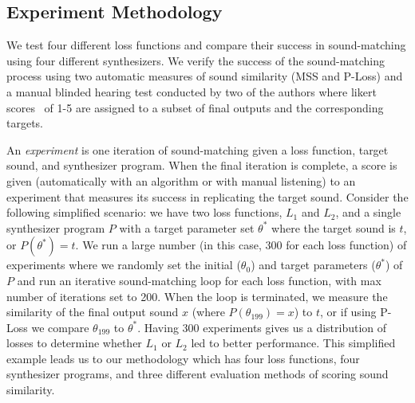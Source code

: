 \documentclass[lettersize,journal]{IEEEtran}
\newcommand{\LossSelect}{\textbf{Loss Selection}}
\newcommand{\SynthSelect}{\textbf{Synthesis Selection}}
\begin{document}

\subsection{Experiment Methodology}
\label{sec:methodology}

We test four different loss functions and compare their success in sound-matching using four different synthesizers. We verify the success of the sound-matching process using two automatic measures of sound similarity (MSS and P-Loss) and a manual blinded hearing test conducted by two of the authors where likert scores~\cite{jebb2021review} of 1-5 are assigned to a subset of final outputs and the corresponding targets.

An \textit{experiment} is one iteration of sound-matching given a loss function, target sound,
and synthesizer program. When the final iteration is complete, a score is given (automatically with an algorithm or with manual listening) to an experiment that measures its success in replicating the target sound. Consider the following simplified scenario: we have two loss functions, $L_1$ and $L_2$, and a single synthesizer program $P$ with a target parameter set $\theta^*$ where the target sound is $t$, or $P(\theta^*) = t$. We run a large number (in this case, 300 for each loss function) of experiments where we randomly set the initial ($\theta_0$) and target parameters ($\theta^*$) of $P$ and run an iterative sound-matching loop for each loss function, with max number of iterations set to 200. When the loop is terminated, we measure the similarity of the final output sound $x$ (where $P(\theta_{199}) = x$) to $t$, or if using P-Loss we compare $\theta_{199}$ to $\theta^*$. Having 300 experiments gives us a distribution of losses to determine whether $L_1$ or $L_2$ led to better performance. This simplified example leads us to our methodology which has four loss functions, four synthesizer programs, and three different evaluation methods of scoring sound similarity.
\end{document}
